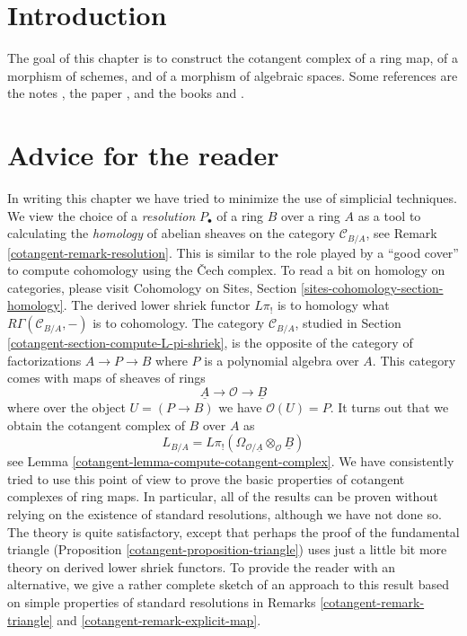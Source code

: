 \section{Introduction}
\label{cotangent-section-introduction}
The goal of this chapter is to construct the cotangent complex of a
ring map, of a morphism of schemes, and of a morphism of algebraic spaces.
Some references are the notes \cite{quillenhomology}, the paper
\cite{quillencohomology}, and the books
\cite{Andre} and \cite{cotangent}.

\section{Advice for the reader}
\label{cotangent-section-advice-reader}
In writing this chapter we have tried to minimize
the use of simplicial techniques. We view the choice of a {\it resolution}
$P_\bullet$ of a ring $B$ over a ring $A$ as a tool to calculating the
{\it homology} of abelian sheaves on the category $\mathcal{C}_{B/A}$, see
Remark \ref{cotangent-remark-resolution}. This is similar to the role played
by a ``good cover'' to compute cohomology using the {\v C}ech complex.
To read a bit on homology on categories, please visit
Cohomology on Sites, Section \ref{sites-cohomology-section-homology}.
The derived lower shriek functor $L\pi_!$ is to homology what
$R\Gamma(\mathcal{C}_{B/A}, -)$ is to cohomology. The category
$\mathcal{C}_{B/A}$, studied in Section \ref{cotangent-section-compute-L-pi-shriek},
is the opposite of the category of factorizations $A \to P \to B$ where $P$
is a polynomial algebra over $A$. This category comes with maps of sheaves
of rings
$$
\underline{A} \longrightarrow \mathcal{O} \longrightarrow \underline{B}
$$
where over the object $U =  (P \to B)$ we have $\mathcal{O}(U) = P$.
It turns out that we obtain the cotangent complex of $B$ over $A$ as
$$
L_{B/A} =
L\pi_!(\Omega_{\mathcal{O}/\underline{A}} \otimes_\mathcal{O} \underline{B})
$$
see Lemma \ref{cotangent-lemma-compute-cotangent-complex}. We have consistently tried
to use this point of view to prove the basic properties of cotangent
complexes of ring maps. In particular, all of the results can be proven
without relying on the existence of standard resolutions, although we have
not done so. The theory is quite satisfactory, except that
perhaps the proof of the fundamental triangle
(Proposition \ref{cotangent-proposition-triangle}) uses just a little
bit more theory on derived lower shriek functors.
To provide the reader with an alternative,
we give a rather complete sketch of an approach to this result
based on simple properties of standard resolutions in
Remarks \ref{cotangent-remark-triangle} and \ref{cotangent-remark-explicit-map}.

